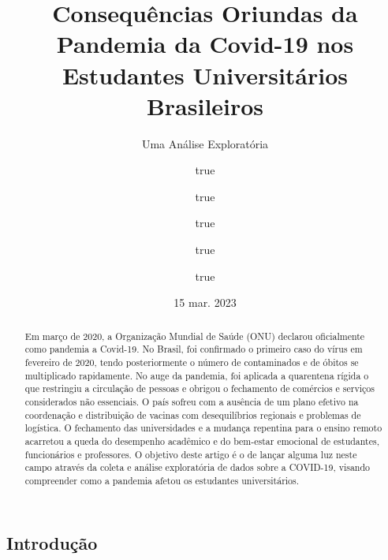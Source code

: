 \documentclass[
]{article}
\title{Consequências Oriundas da Pandemia da Covid-19 nos Estudantes
Universitários Brasileiros}
\subtitle{Uma Análise Exploratória}
\author{true \and true \and true \and true \and true}
\date{15 mar. 2023}
\begin{document}
\maketitle
\begin{abstract}
Em março de 2020, a Organização Mundial de Saúde (ONU) declarou
oficialmente como pandemia a Covid-19. No Brasil, foi confirmado o
primeiro caso do vírus em fevereiro de 2020, tendo posteriormente o
número de contaminados e de óbitos se multiplicado rapidamente. No auge
da pandemia, foi aplicada a quarentena rígida o que restringiu a
circulação de pessoas e obrigou o fechamento de comércios e serviços
considerados não essenciais. O país sofreu com a ausência de um plano
efetivo na coordenação e distribuição de vacinas com desequilíbrios
regionais e problemas de logística. O fechamento das universidades e a
mudança repentina para o ensino remoto acarretou a queda do desempenho
acadêmico e do bem-estar emocional de estudantes, funcionários e
professores. O objetivo deste artigo é o de lançar alguma luz neste
campo através da coleta e análise exploratória de dados sobre a
COVID-19, visando compreender como a pandemia afetou os estudantes
universitários.
\end{abstract}

\hypertarget{introduuxe7uxe3o}{%
\subsection{Introdução}\label{introduuxe7uxe3o}}
\end{document}
